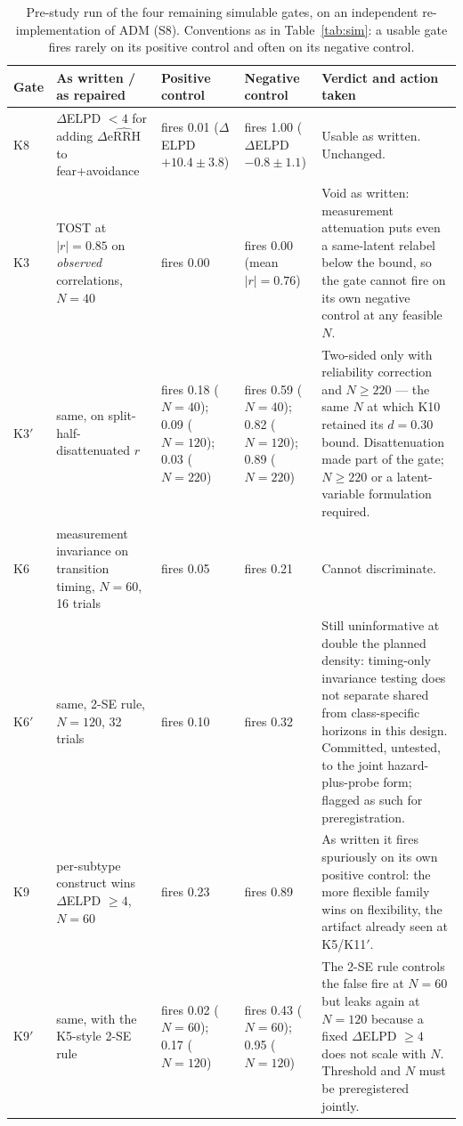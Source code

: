 \documentclass[9pt,twocolumn]{article}
\newcommand{\eRRHhat}{\widehat{\mathrm{eRRH}}}
\begin{document}
\begin{table}[!t]
\centering
\caption{Pre-study run of the four remaining simulable gates, on an independent re-implementation of ADM (S8). Conventions as in Table~\ref{tab:sim}: a usable gate fires rarely on its positive control and often on its negative control.}
\label{tab:sim2}
\small
\begin{tabularx}{\textwidth}{p{}p{}p{}p{}X}
\toprule
\textbf{Gate} & \textbf{As written / as repaired} & \textbf{Positive control} & \textbf{Negative control} & \textbf{Verdict and action taken} \\
\midrule
K8 & $\Delta$ELPD $<4$ for adding $\Delta\eRRHhat$ to fear+avoidance & fires 0.01 ($\Delta$ELPD $+10.4\pm3.8$) & fires 1.00 ($\Delta$ELPD $-0.8\pm1.1$) & Usable as written. Unchanged. \\
K3 & TOST at $|r|=0.85$ on \emph{observed} correlations, $N=40$ & fires 0.00 & fires 0.00 (mean $|r|=0.76$) & Void as written: measurement attenuation puts even a same-latent relabel below the bound, so the gate cannot fire on its own negative control at any feasible $N$. \\
K3$'$ & same, on split-half-disattenuated $r$ & fires 0.18 ($N=40$); 0.09 ($N=120$); 0.03 ($N=220$) & fires 0.59 ($N=40$); 0.82 ($N=120$); 0.89 ($N=220$) & Two-sided only with reliability correction and $N\ge220$ --- the same $N$ at which K10 retained its $d=0.30$ bound. Disattenuation made part of the gate; $N\ge220$ or a latent-variable formulation required. \\
K6 & measurement invariance on transition timing, $N=60$, 16 trials & fires 0.05 & fires 0.21 & Cannot discriminate. \\
K6$'$ & same, 2-SE rule, $N=120$, 32 trials & fires 0.10 & fires 0.32 & Still uninformative at double the planned density: timing-only invariance testing does not separate shared from class-specific horizons in this design. Committed, untested, to the joint hazard-plus-probe form; flagged as such for preregistration. \\
K9 & per-subtype construct wins $\Delta$ELPD $\ge4$, $N=60$ & fires 0.23 & fires 0.89 & As written it fires spuriously on its own positive control: the more flexible family wins on flexibility, the artifact already seen at K5/K11$'$. \\
K9$'$ & same, with the K5-style 2-SE rule & fires 0.02 ($N=60$); 0.17 ($N=120$) & fires 0.43 ($N=60$); 0.95 ($N=120$) & The 2-SE rule controls the false fire at $N=60$ but leaks again at $N=120$ because a fixed $\Delta$ELPD $\ge4$ does not scale with $N$. Threshold and $N$ must be preregistered jointly. \\
\bottomrule
\end{tabularx}
\end{table}
\end{document}

